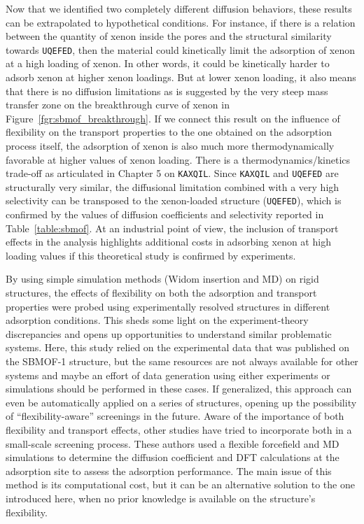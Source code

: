 \documentclass[main]{subfiles}
\begin{document}
Now that we identified two completely different diffusion behaviors, these results can be extrapolated to hypothetical conditions. For instance, if there is a relation between the quantity of xenon inside the pores and the structural similarity towards \texttt{UQEFED}, then the material could kinetically limit the adsorption of xenon at a high loading of xenon. In other words, it could be kinetically harder to adsorb xenon at higher xenon loadings. But at lower xenon loading, it also means that there is no diffusion limitations as is suggested by the very steep mass transfer zone on the breakthrough curve of xenon in Figure~\ref{fgr:sbmof_breakthrough}. If we connect this result on the influence of flexibility on the transport properties to the one obtained on the adsorption process itself, the adsorption of xenon is also much more thermodynamically favorable at higher values of xenon loading. There is a thermodynamics/kinetics trade-off as articulated in Chapter 5 on \texttt{KAXQIL}. Since \texttt{KAXQIL} and \texttt{UQEFED} are structurally very similar, the diffusional limitation combined with a very high selectivity can be transposed to the xenon-loaded structure (\texttt{UQEFED}), which is confirmed by the values of diffusion coefficients and selectivity reported in Table~\ref{table:sbmof}. At an industrial point of view, the inclusion of transport effects in the analysis highlights additional costs in adsorbing xenon at high loading values if this theoretical study is confirmed by experiments.

By using simple simulation methods (Widom insertion and MD) on rigid structures, the effects of flexibility on both the adsorption and transport properties were probed using experimentally resolved structures in different adsorption conditions. This sheds some light on the experiment-theory discrepancies and opens up opportunities to understand similar problematic systems. Here, this study relied on the experimental data that was published on the SBMOF-1 structure, but the same resources are not always available for other systems and maybe an effort of data generation using either experiments or simulations should be performed in these cases. If generalized, this approach can even be automatically applied on a series of structures, opening up the possibility of ``flexibility-aware'' screenings in the future. Aware of the importance of both flexibility and transport effects, other studies have tried to incorporate both in a small-scale screening process.\autocite{Stanton_2022} These authors used a flexible forcefield and MD simulations to determine the diffusion coefficient and DFT calculations at the adsorption site to assess the adsorption performance. The main issue of this method is its computational cost, but it can be an alternative solution to the one introduced here, when no prior knowledge is available on the structure’s flexibility. 
\end{document}

